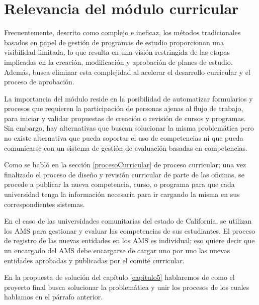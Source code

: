 \section{Relevancia del módulo curricular}
Frecuentemente, descrito como complejo e ineficaz, los métodos tradicionales basados en papel de gestión de programas de estudio proporcionan una visibilidad limitada, lo que resulta en una visión restringida de las etapas implicadas en la creación, modificación y aprobación de planes de estudio. Además, busca eliminar esta complejidad al acelerar el desarrollo curricular y el proceso de aprobación.

La importancia del módulo reside en la posibilidad de automatizar formularios y procesos que requieren la participación de personas ajenas al flujo de trabajo, para iniciar y validar propuestas de creación o revisión de cursos y programas. Sin embargo, hay alternativas que buscan solucionar la misma problemática pero no existe alternativa que pueda soportar el uso de competencias ni que pueda comunicarse con un sistema de gestión de evaluación basadas en competencias.

Como se habló en la sección \ref{procesoCurricular} de proceso curricular; una vez finalizado el proceso de diseño y revisión curricular de parte de las oficinas, se procede a publicar la nueva competencia, curso, o programa para que cada universidad tenga la información necesaria para ir cargando la misma en sus correspondientes sistemas. 

En el caso de las universidades comunitarias del estado de California, se utilizan los AMS para gestionar y evaluar las competencias de sus estudiantes. El proceso de registro de las nuevas entidades en los AMS es individual; eso quiere decir que un encargado del AMS debe encargarse de cargar uno por uno las nuevas entidades aprobadas y publicadas por el comité curricular.

En la propuesta de solución del capítulo \ref{capitulo5} hablaremos de como el proyecto final busca solucionar la problemática y unir los procesos de los cuales hablamos en el párrafo anterior.
